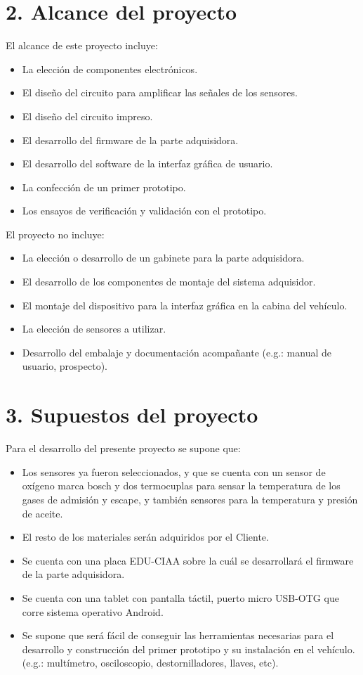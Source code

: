 \documentclass[11pt]{charter}
\begin{document}
\section{2. Alcance del proyecto}
\label{sec:alcance}

El alcance de este proyecto incluye:
\begin{itemize}
\item La elección de componentes electrónicos.
\item El diseño del circuito para amplificar las señales de los sensores.
\item El diseño del circuito impreso.
\item El desarrollo del firmware de la parte adquisidora.
\item El desarrollo del software de la interfaz gráfica de usuario.
\item La confección de un primer prototipo.
\item Los ensayos de verificación y validación con el prototipo.
\end{itemize}

El proyecto no incluye:
\begin{itemize}
\item La elección o desarrollo de un gabinete para la parte adquisidora.
\item El desarrollo de los componentes de montaje del sistema adquisidor.
\item El montaje del dispositivo para la interfaz gráfica en la cabina del vehículo.
\item La elección de sensores a utilizar.
\item Desarrollo del embalaje y documentación acompañante (e.g.: manual de usuario, prospecto).
\end{itemize}

\section{3. Supuestos del proyecto}
\label{sec:supuestos}

Para el desarrollo del presente proyecto se supone que:

\begin{itemize}
\item Los sensores ya fueron seleccionados, y que se cuenta con un sensor de oxígeno marca bosch y dos termocuplas para sensar la temperatura de los gases de admisión y escape, y también sensores para la temperatura y presión de aceite.
\item El resto de los materiales serán adquiridos por el Cliente.
\item Se cuenta con una placa EDU-CIAA sobre la cuál se desarrollará el firmware de la parte adquisidora.
\item Se cuenta con una tablet con pantalla táctil, puerto micro USB-OTG que corre sistema operativo Android.
\item Se supone que será fácil de conseguir las herramientas necesarias para el desarrollo y construcción del primer prototipo y su instalación en el vehículo. (e.g.: multímetro, osciloscopio, destornilladores, llaves, etc).
\end{itemize}
\end{document}
